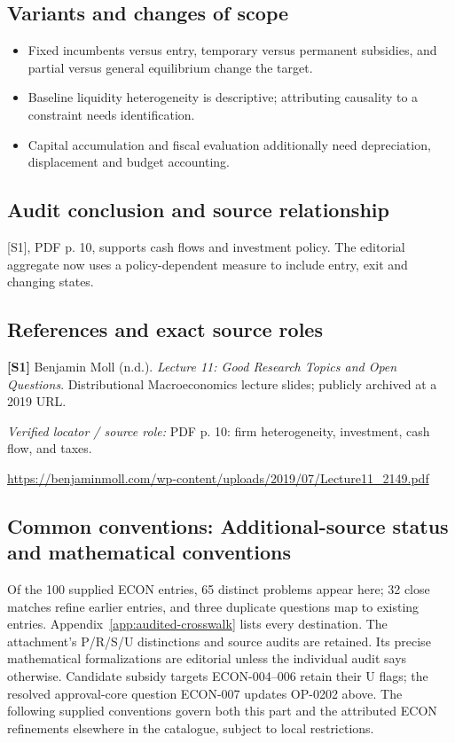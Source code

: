 \documentclass[11pt,a4paper]{article}
\begin{document}
\subsection*{Variants and changes of scope}

\begin{itemize}
\item Fixed incumbents versus entry, temporary versus permanent subsidies, and partial versus general equilibrium change the target.
\item Baseline liquidity heterogeneity is descriptive; attributing causality to a constraint needs identification.
\item Capital accumulation and fiscal evaluation additionally need depreciation, displacement and budget accounting.
\end{itemize}

\subsection*{Audit conclusion and source relationship}

[S1], PDF p. 10, supports cash flows and investment policy. The editorial aggregate now uses a policy-dependent measure to include entry, exit and changing states.

\subsection*{References and exact source roles}

{\footnotesize\raggedright
\par\noindent\textbf{[S1]} Benjamin Moll (n.d.). \emph{Lecture 11: Good Research Topics and Open Questions}. Distributional Macroeconomics lecture slides; publicly archived at a 2019 URL.\par \textit{Verified locator / source role:} PDF p. 10: firm heterogeneity, investment, cash flow, and taxes.\par \url{https://benjaminmoll.com/wp-content/uploads/2019/07/Lecture11_2149.pdf}\par\smallskip
}

\subsection*{Common conventions: Additional-source status and mathematical conventions}

\label{audited:conventions}

Of the 100 supplied ECON entries, 65 distinct problems appear here; 32 close
matches refine earlier entries, and three duplicate questions map to existing
entries. Appendix~\ref{app:audited-crosswalk} lists every destination.
The attachment's P/R/S/U distinctions and source audits are retained. Its
precise mathematical formalizations are editorial unless the individual audit
says otherwise. Candidate subsidy targets ECON-004--006 retain their U flags;
the resolved approval-core question ECON-007 updates OP-0202 above.
The following supplied conventions govern both this part and the attributed
ECON refinements elsewhere in the catalogue, subject to local restrictions.
\end{document}
